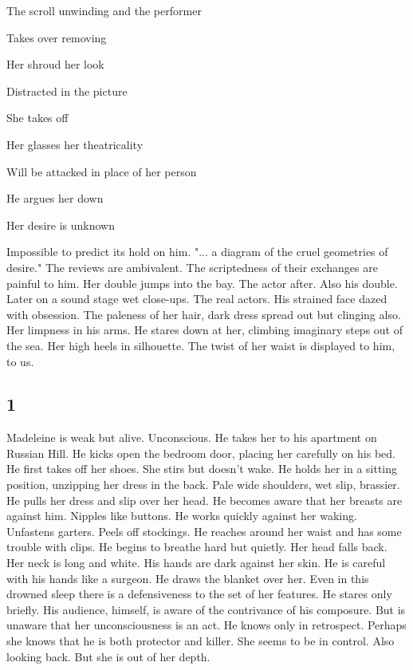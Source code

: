 The scroll unwinding and the performer

Takes over removing

Her shroud her look

Distracted in the picture

She takes off

Her glasses her theatricality

Will be attacked in place of her person

He argues her down

Her desire is unknown

Impossible to predict its hold on him. "... a diagram of the cruel
geometries of desire." The reviews are ambivalent. The scriptedness of
their exchanges are painful to him. Her double jumps into the bay. The
actor after. Also his double. Later on a sound stage wet close-ups. The
real actors. His strained face dazed with obsession. The paleness of her
hair, dark dress spread out but clinging also. Her limpness in his arms.
He stares down at her, climbing imaginary steps out of the sea. Her high
heels in silhouette. The twist of her waist is displayed to him, to us.

\hypertarget{section-14}{%
\subsection{1}\label{section-14}}

Madeleine is weak but alive. Unconscious. He takes her to his apartment
on Russian Hill. He kicks open the bedroom door, placing her carefully
on his bed. He first takes off her shoes. She stirs but doesn't wake. He
holds her in a sitting position, unzipping her dress in the back. Pale
wide shoulders, wet slip, brassier. He pulls her dress and slip over her
head. He becomes aware that her breasts are against him. Nipples like
buttons. He works quickly against her waking. Unfastens garters. Peels
off stockings. He reaches around her waist and has some trouble with
clips. He begins to breathe hard but quietly. Her head falls back. Her
neck is long and white. His hands are dark against her skin. He is
careful with his hands like a surgeon. He draws the blanket over her.
Even in this drowned sleep there is a defensiveness to the set of her
features. He stares only briefly. His audience, himself, is aware of the
contrivance of his composure. But is unaware that her unconsciousness is
an act. He knows only in retrospect. Perhaps she knows that he is both
protector and killer. She seems to be in control. Also looking back. But
she is out of her depth.

